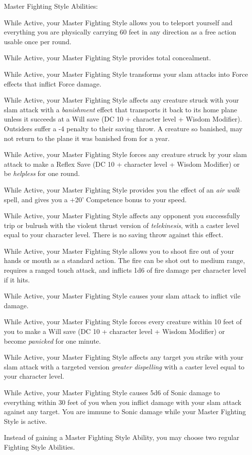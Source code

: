Master Fighting Style Abilities:
\begin{itemize*}
\item While Active, your Master Fighting Style allows you to teleport yourself and everything you are physically carrying 60 feet in any direction as a free action usable once per round.
\item While Active, your Master Fighting Style provides total concealment. 
\item While Active, your Master Fighting Style transforms your slam attacks into Force effects that inflict Force damage.
\item While Active, your Master Fighting Style affects any creature struck with your slam attack with a \textit{banishment} effect that transports it back to its home plane unless it succeeds at a Will save (DC 10 +  character level + Wisdom Modifier). Outsiders suffer a -4 penalty to their saving throw. A creature so banished, may not return to the plane it was banished from for a year.
\item While Active, your Master Fighting Style forces any creature struck by your slam attack to make a Reflex Save (DC 10 +  character level + Wisdom Modifier) or be \textit{helpless} for one round.
\item While Active, your Master Fighting Style provides you the effect of an \textit{air walk} spell, and gives you a +20' Competence bonus to your speed.
\item While Active, your Master Fighting Style affects any opponent you successfully trip or bulrush with the violent thrust version of \textit{telekinesis}, with a caster level equal to your character level. There is no saving throw against this effect.
\item While Active, your Master Fighting Style allows you to shoot fire out of your hands or mouth as a standard action. The fire can be shot out to medium range, requires a ranged touch attack, and inflicts 1d6 of fire damage per character level if it hits.
\item While Active, your Master Fighting Style causes your slam attack to inflict vile damage.
\item While Active, your Master Fighting Style forces every creature within 10 feet of you to make a Will save (DC 10 +  character level + Wisdom Modifier) or become \textit{panicked} for one minute.
\item While Active, your Master Fighting Style affects any target you strike with your slam attack with a targeted version \textit{greater dispelling} with a caster level equal to your character level. 
\item While Active, your Master Fighting Style causes 5d6 of Sonic damage to everything within 30 feet of you when you inflict damage with your slam attack against any target. You are immune to Sonic damage while your Master Fighting Style is active.
\item Instead of gaining a Master Fighting Style Ability, you may choose two regular Fighting Style Abilities.
\end{itemize*}

